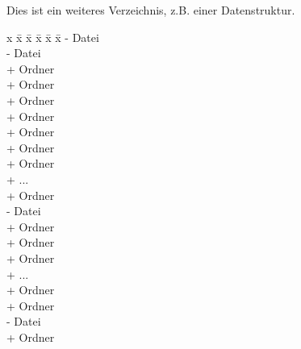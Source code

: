 Dies ist ein weiteres Verzeichnis, z.B. einer Datenstruktur.

\vspace{1cm}
\parbox{0cm}{\begin{tabbing}
x \= x \= x \= x \= x \= x \kill
- Datei \\
- Datei \\
+ Ordner \\
+ Ordner \\
\> + Ordner \\
\>\> + Ordner \\
\>\>\> + Ordner \\
\>\>\>\> + Ordner \\
\>\>\>\> + Ordner \\
\>\>\>\> + ... \\
\>\> + Ordner \\
\>\>\> - Datei \\
\>\> + Ordner \\
\>\>\> + Ordner \\
\>\>\> + Ordner \\
\>\>\> + ... \\
+ Ordner \\
\> + Ordner \\
\>\> - Datei \\
\>\>\> + Ordner \\
\end{tabbing}}